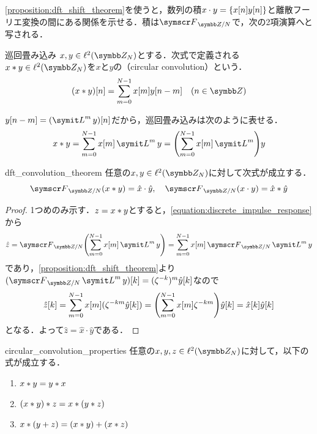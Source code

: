 \documentclass[../../main]{subfiles}
\begin{document}
\cref{proposition:dft_shift_theorem}を使うと，数列の積\(x\cdot y=\lbrace x[n]y[n]\rbrace\)と離散フーリエ変換の間にある関係を示せる．積は\(\dft{N}\)で，次の2項演算へと写される．

\begin{definition}{巡回畳み込み}{}
  \(x,y\in\cycles{N}\)とする．次式で定義される\(x\circconv y\in\cycles{N}\)を\(x\)と\(y\)の（circular convolution）という．
  \[
    (x\circconv y)[n] = \sum_{m=0}^{N-1}x[m]y[n-m]\quad(n\in\numset{Z})
  \]
\end{definition}

\(y[n-m]=(\lagop^my)[n]\)だから，巡回畳み込みは次のように表せる．
\begin{equation}
  \label{equation:discrete_impulse_response}
  x\circconv y = \sum_{m=0}^{N-1}x[m]\lagop^my
  = \pqty*{\sum_{m=0}^{N-1}x[m]\lagop^m}y
\end{equation}

\begin{proposition}{}{dft_convolution_theorem}
  任意の\(x,y\in\cycles{N}\)に対して次式が成立する．
  \[
    \dft{N}(x\circconv y) = \hat{x}\cdot\hat{y},
    \quad\dft{N}(x\cdot y) = \hat{x}\circconv\hat{y}
  \]
\end{proposition}

\begin{proof}
  1つめのみ示す．\(z=x\ast y\)とすると，\cref{equation:discrete_impulse_response}から
  \[
    \hat{z} = \dft{N}\pqty*{\sum_{m=0}^{N-1}x[m]\lagop^my}
    = \sum_{m=0}^{N-1}x[m]\dft{N}\lagop^my
  \]
  であり，\cref{proposition:dft_shift_theorem}より\((\dft{N}\lagop^my)[k]=(\zeta^{-k})^m\hat{y}[k]\)なので
  \[
    \hat{z}[k] = \sum_{m=0}^{N-1}x[m](\zeta^{-km}\hat{y}[k])
    = \pqty*{\sum_{m=0}^{N-1}x[m]\zeta^{-km}}\hat{y}[k]
    = \hat{x}[k]\hat{y}[k]
  \]
  となる．よって\(\hat{z}=\hat{x}\cdot\hat{y}\)である．
\end{proof}

\begin{corollary}{}{circular_convolution_properties}
  任意の\(x,y,z\in\cycles{N}\)に対して，以下の式が成立する．
  \begin{enumerate}
    \item \(x\ast y=y\ast x\)
    \item \((x\ast y)\ast z=x\ast (y\ast z)\)
    \item \(x\ast(y+z)=(x\ast y)+(x\ast z)\)
  \end{enumerate}
\end{corollary}
\end{document}
